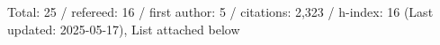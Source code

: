 Total: 25 / refereed: 16 / first author: 5 / citations: 2,323 / h-index: 16 (Last updated: 2025-05-17), List attached below